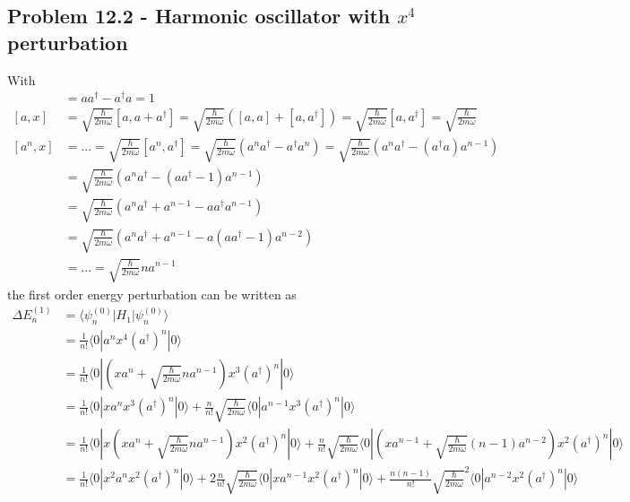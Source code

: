 \documentclass[10pt,a4paper]{book}
\theoremstyle{definition}
\begin{document}
\subsection{Problem 12.2 - Harmonic oscillator with $x^4$ perturbation}
With
\begin{align}
[a,a^\dagger]&=aa^\dagger-a^\dagger a=1\\
[a,x]&=\sqrt{\frac{\hbar}{2m\omega}}[a,a+a^\dagger]=\sqrt{\frac{\hbar}{2m\omega}}\left([a,a]+[a,a^\dagger]\right)=\sqrt{\frac{\hbar}{2m\omega}}[a,a^\dagger]=\sqrt{\frac{\hbar}{2m\omega}}\\
[a^n,x]&=...=\sqrt{\frac{\hbar}{2m\omega}}[a^n,a^\dagger]
=\sqrt{\frac{\hbar}{2m\omega}}(a^na^\dagger-a^\dagger a^n)
=\sqrt{\frac{\hbar}{2m\omega}}(a^na^\dagger-(a^\dagger a) a^{n-1})\\
&=\sqrt{\frac{\hbar}{2m\omega}}(a^na^\dagger-(aa^\dagger-1) a^{n-1})\\
&=\sqrt{\frac{\hbar}{2m\omega}}(a^na^\dagger+a^{n-1}-aa^\dagger a^{n-1})\\
&=\sqrt{\frac{\hbar}{2m\omega}}(a^na^\dagger+a^{n-1}-a(aa^\dagger-1) a^{n-2})\\
&=...=\sqrt{\frac{\hbar}{2m\omega}}na^{n-1}
\end{align}
the first order energy perturbation can be written as
\begin{align}
\Delta E^{(1)}_n
&=\langle\psi^{(0)}_n|H_1|\psi^{(0)}_n\rangle\\
&=\frac{1}{n!}\langle0|a^nx^4(a^\dagger)^n|0\rangle\\
&=\frac{1}{n!}\langle0|\left(xa^n+\sqrt{\frac{\hbar}{2m\omega}}na^{n-1}\right)x^3(a^\dagger)^n|0\rangle\\
&=\frac{1}{n!}\langle0|xa^nx^3(a^\dagger)^n|0\rangle+\frac{n}{n!}\sqrt{\frac{\hbar}{2m\omega}}\langle0|a^{n-1}x^3(a^\dagger)^n|0\rangle\\
&=\frac{1}{n!}\langle0|x\left(xa^n+\sqrt{\frac{\hbar}{2m\omega}}na^{n-1}\right)x^2(a^\dagger)^n|0\rangle+\frac{n}{n!}\sqrt{\frac{\hbar}{2m\omega}}\langle0|\left(xa^{n-1}+\sqrt{\frac{\hbar}{2m\omega}}(n-1)a^{n-2}\right)x^2(a^\dagger)^n|0\rangle\\
&=\frac{1}{n!}\langle0|x^2a^nx^2(a^\dagger)^n|0\rangle+
2\frac{n}{n!}\sqrt{\frac{\hbar}{2m\omega}}\langle0|xa^{n-1}x^2(a^\dagger)^n|0\rangle+\frac{n(n-1)}{n!}\sqrt{\frac{\hbar}{2m\omega}}^2\langle0|a^{n-2}x^2(a^\dagger)^n|0\rangle\\
\end{align}
\end{document}
